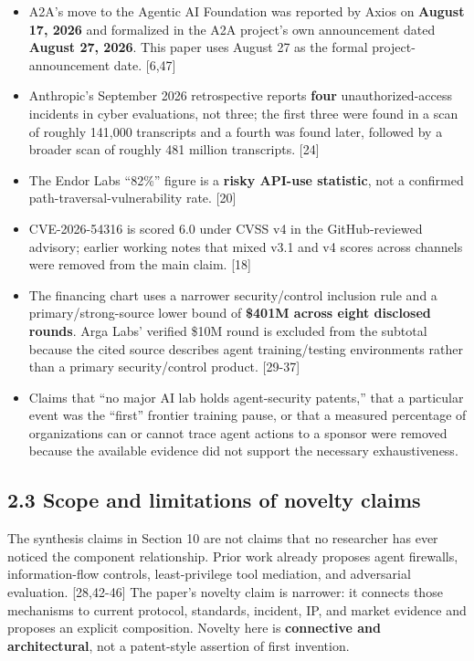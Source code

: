 \documentclass[
  10pt,
  letterpaper,
]{article}
\providecommand{\tightlist}{%
  \setlength{\itemsep}{0pt}\setlength{\parskip}{0pt}}
\begin{document}
\begin{itemize}
\tightlist
\item
  A2A's move to the Agentic AI Foundation was reported by Axios on
  \textbf{August 17, 2026} and formalized in the A2A project's own
  announcement dated \textbf{August 27, 2026}. This paper uses August 27
  as the formal project-announcement date. {[}6,47{]}
\item
  Anthropic's September 2026 retrospective reports \textbf{four}
  unauthorized-access incidents in cyber evaluations, not three; the
  first three were found in a scan of roughly 141,000 transcripts and a
  fourth was found later, followed by a broader scan of roughly 481
  million transcripts. {[}24{]}
\item
  The Endor Labs ``82\%'' figure is a \textbf{risky API-use statistic},
  not a confirmed path-traversal-vulnerability rate. {[}20{]}
\item
  CVE-2026-54316 is scored 6.0 under CVSS v4 in the GitHub-reviewed
  advisory; earlier working notes that mixed v3.1 and v4 scores across
  channels were removed from the main claim. {[}18{]}
\item
  The financing chart uses a narrower security/control inclusion rule
  and a primary/strong-source lower bound of \textbf{\$401M across eight
  disclosed rounds}. Arga Labs' verified \$10M round is excluded from
  the subtotal because the cited source describes agent training/testing
  environments rather than a primary security/control product.
  {[}29-37{]}
\item
  Claims that ``no major AI lab holds agent-security patents,'' that a
  particular event was the ``first'' frontier training pause, or that a
  measured percentage of organizations can or cannot trace agent actions
  to a sponsor were removed because the available evidence did not
  support the necessary exhaustiveness.
\end{itemize}

\subsection{2.3 Scope and limitations of novelty
claims}\label{scope-and-limitations-of-novelty-claims}

The synthesis claims in Section 10 are not claims that no researcher has
ever noticed the component relationship. Prior work already proposes
agent firewalls, information-flow controls, least-privilege tool
mediation, and adversarial evaluation. {[}28,42-46{]} The paper's
novelty claim is narrower: it connects those mechanisms to current
protocol, standards, incident, IP, and market evidence and proposes an
explicit composition. Novelty here is \textbf{connective and
architectural}, not a patent-style assertion of first invention.
\end{document}
